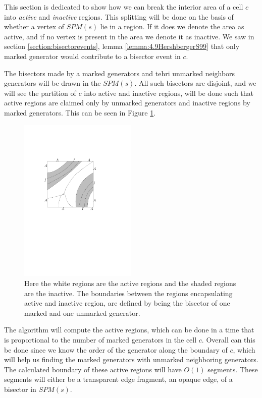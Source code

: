 This section is dedicated to show how we can break the interior area of a cell $c$ into 
\textit{active} and \textit{inactive} regions. This splitting will be done on the basis of 
whether a vertex of $SPM(s)$ lie in a region. If it does we denote the area as active, and if 
no vertex is present in the area we denote it as inactive. We saw in section 
\ref{section:bisectorevents}, lemma \ref{lemma:4.9HershbergerS99} that only marked generator 
would contribute to a bisector event in $c$. 

The bisectors made by a marked generators and tehri unmarked neighbors generators will be drawn in the 
$SPM(s)$. All such bisectors are disjoint, and we will see the partition of $c$ into active 
and inactive regions, will be done such that active regions are claimed only by unmarked 
generators and inactive regions by marked generators. This can be seen in Figure 
\ref{fig:activeinactiveregions}. 

\begin{figure}[H]
	\centering
	\includegraphics[width=0.5\textwidth]{figures/activeinactiveregions.pdf}
	\caption{Here the white regions are the active regions and the shaded regions are the inactive. The 
    		 boundaries between the regions encapsulating active and inactive region, are 
             defined by being the bisector of one marked and one unmarked generator\cite{HershbergerS99}.}
	\label{fig:activeinactiveregions}
\end{figure}

The algorithm will compute the active regions, which can be done in a time that is proportional to the 
number of marked generators in the cell $c$. Overall can this be done since we know the order of the 
generator along the boundary of $c$, which will help us finding the marked generators with unmarked 
neighboring generators. The calculated boundary of these active regions will have $O(1)$ segments. 
These segments will either be a transparent edge fragment, an opaque edge, of a bisector in $SPM(s)$.

